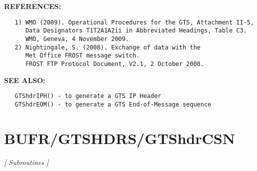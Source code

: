 \textbf{REFERENCES:}\hspace{0.08in}\begin{Verbatim}
   1) WMO (2009). Operational Procedures for the GTS, Attachment II-5,
      Data Designators T1T2A1A2ii in Abbreviated Headings, Table C3.
      WMO, Geneva, 4 November 2009.
   2) Nightingale, S. (2008). Exchange of data with the
      Met Office FROST message switch.
      FROST FTP Protocol Document, V2.1, 2 October 2008.
\end{Verbatim}
\textbf{SEE ALSO:}\hspace{0.08in}\begin{Verbatim}
   GTShdrIPH() - to generate a GTS IP Header
   GTShdrEOM() - to generate a GTS End-of-Message sequence
\end{Verbatim}
\section{BUFR/GTSHDRS/GTShdrCSN}
\textsl{[ Subroutines ]}

